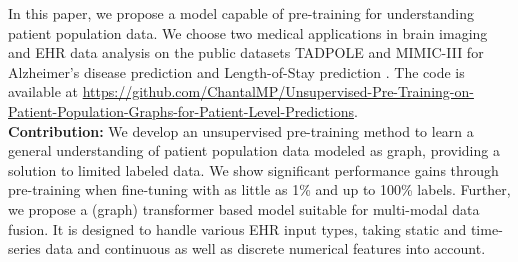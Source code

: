 \documentclass[runningheads]{llncs}
\begin{document}
In this paper, we propose a model capable of pre-training for understanding patient population data. We choose two medical applications in brain imaging and EHR data analysis on the public datasets TADPOLE \cite{tadpole} and MIMIC-III \cite{mimic} for Alzheimer’s disease prediction \cite{parisot2018disease,kazi2019self,cosmo2020latent} and Length-of-Stay prediction \cite{zebin2019deep,wang2020mimicextract,mcdermott2021EHRbenchmark}. The code is available at \href{https://github.com/ChantalMP/Unsupervised-Pre-Training-on-Patient-Population-Graphs-for-Patient-Level-Predictions}{https://github.com/ChantalMP/Unsupervised-Pre-Training-on-Patient-Population-Graphs-for-Patient-Level-Predictions}.\\
\textbf{Contribution:} We develop an unsupervised pre-training method to learn a general understanding of patient population data modeled as graph, providing a solution to limited labeled data. We show significant performance gains through pre-training when fine-tuning with as little as 1\% and up to 100\% labels. Further, we propose a (graph) transformer based model suitable for multi-modal data fusion. It is designed to handle various EHR input types, taking static and time-series data and continuous as well as discrete numerical features into account.
\end{document}
